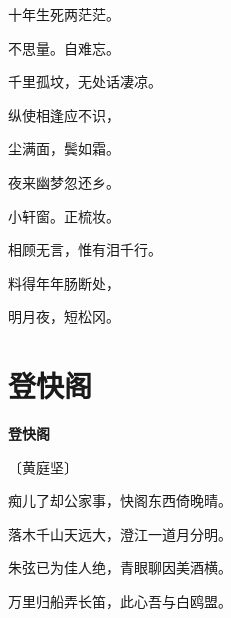 \documentclass[12pt,UTF-8,openany,fontset=none]{ctexbook}
\begin{document}
\begin{center}
    \begin{Large}

        十年生死两茫茫。

        不思量。自难忘。

        千里孤坟，无处话凄凉。

        纵使相逢应不识，

        尘满面，鬓如霜。

        \vspace{18pt}  %

        夜来幽梦忽还乡。

        小轩窗。正梳妆。

        相顾无言，惟有泪千行。

        料得年年肠断处，

        明月夜，短松冈。

    \end{Large}

\end{center}

\vspace{8pt}
\clearpage

\section{登快阁}


\begin{center}
    {\bfseries 登快阁}

    \vspace{18pt}

    \begin{large}\xuwen
        〔黄庭坚〕
    \end{large}

\end{center}

    \vspace{18pt}  %

\begin{center}
    \begin{Large}

        痴儿了却公家事，快阁东西倚晚晴。

        落木千山天远大，澄江一道月分明。

        朱弦已为佳人绝，青眼聊因美酒横。

        万里归船弄长笛，此心吾与白鸥盟。

    \end{Large}

\end{center}
\end{document}
